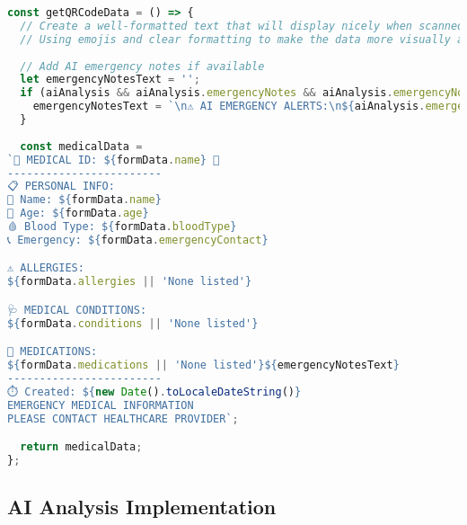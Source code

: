 \documentclass[12pt,a4paper]{report}
\begin{document}
\begin{lstlisting}[language=JavaScript, caption=QR Code Generation]
const getQRCodeData = () => {
  // Create a well-formatted text that will display nicely when scanned
  // Using emojis and clear formatting to make the data more visually appealing
  
  // Add AI emergency notes if available
  let emergencyNotesText = '';
  if (aiAnalysis && aiAnalysis.emergencyNotes && aiAnalysis.emergencyNotes.length > 0) {
    emergencyNotesText = `\n⚠️ AI EMERGENCY ALERTS:\n${aiAnalysis.emergencyNotes.join('\n')}\n`;
  }
  
  const medicalData = 
`🏥 MEDICAL ID: ${formData.name} 🏥
------------------------
📋 PERSONAL INFO:
👤 Name: ${formData.name}
🔢 Age: ${formData.age}
🩸 Blood Type: ${formData.bloodType}
📞 Emergency: ${formData.emergencyContact}

⚠️ ALLERGIES:
${formData.allergies || 'None listed'}

🩺 MEDICAL CONDITIONS:
${formData.conditions || 'None listed'}

💊 MEDICATIONS:
${formData.medications || 'None listed'}${emergencyNotesText}
------------------------
⏱️ Created: ${new Date().toLocaleDateString()}
EMERGENCY MEDICAL INFORMATION
PLEASE CONTACT HEALTHCARE PROVIDER`;

  return medicalData;
};
\end{lstlisting}

\subsection{AI Analysis Implementation}
\end{document}
